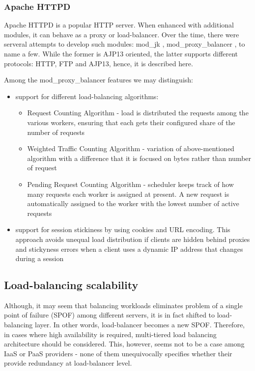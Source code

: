 \subsubsection*{Apache HTTPD}
Apache HTTPD \cite{ApacheHTTPD} is a popular HTTP server. When enhanced with additional modules, it can behave as a proxy or load-balancer. Over the time, there were serveral attempts to develop such modules: mod\_jk \cite{ApacheModJk}, mod\_proxy\_balancer \cite{ApacheModProxyBalancer}, to name a few. While the former is AJP13 oriented, the latter supports different protocols: HTTP, FTP and AJP13, hence, it is described here.

Among the mod\_proxy\_balancer features we may distinguish:
\begin{itemize}
 \item support for different load-balancing algorithms:
    \begin{itemize}
      \item Request Counting Algorithm - load is distributed the requests among the various workers, ensuring that each gets their configured share of the number of requests
      \item Weighted Traffic Counting Algorithm - variation of above-mentioned algorithm with a difference that it is focused on bytes rather than number of request
      \item Pending Request Counting Algorithm - scheduler keeps track of how many requests each worker is assigned at present. A new request is automatically assigned to the worker with the lowest number of active requests
    \end{itemize}

 \item support for session stickiness by using cookies and URL encoding. This approach \cite{ApacheModProxyBalancer} avoids unequal load distribution if clients are hidden behind proxies and stickyness errors when a client uses a dynamic IP address that changes during a session
\end{itemize}

\subsection{Load-balancing scalability}
Although, it may seem that balancing workloads eliminates problem of a single point of failure (SPOF) among different servers, it is in fact shifted to load-balancing layer. In other words, load-balancer becomes a new SPOF. Therefore, in cases where high availability is required, multi-tiered load balancing architecture should be considered. This, however, seems not to be a case among IaaS or PaaS providers - none of them unequivocally specifies whether their provide redundancy at load-balancer level.

